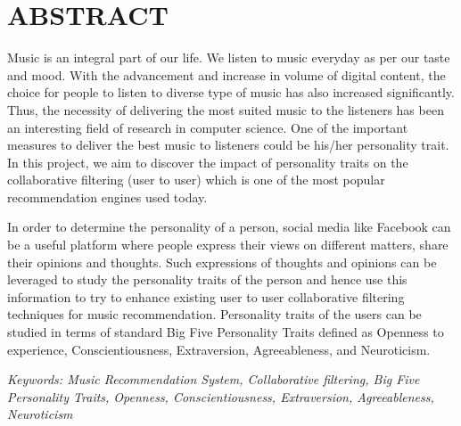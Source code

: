 


\newpage
\section*{ABSTRACT}
Music is an integral part of our life. We listen to music everyday as per our taste and mood. With the advancement and increase in volume of digital content, the choice for people to listen to diverse type of music has also increased significantly. Thus, the necessity of delivering the most suited music to the listeners has been an interesting field of research in computer science. One of the important measures to deliver the best music to listeners could be his/her personality trait. In this project, we aim to discover the impact of personality traits on the collaborative filtering (user to user) which is one of the most popular recommendation engines used today.

In order to determine the personality of a person, social media like Facebook can be a useful platform where people express their views on different matters, share their opinions and thoughts. Such expressions of thoughts and opinions can be leveraged to study the personality traits of the person and hence use this information to try to enhance existing user to user collaborative filtering techniques for music recommendation. Personality traits of the users can be studied in terms of standard Big Five Personality Traits defined as Openness to experience, Conscientiousness, Extraversion, Agreeableness, and Neuroticism.

{\em Keywords: Music Recommendation System, Collaborative filtering, Big Five Personality Traits, Openness, Conscientiousness, Extraversion, Agreeableness, Neuroticism}